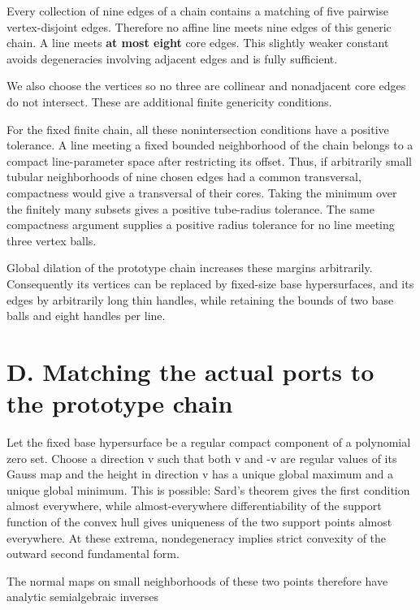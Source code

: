 \documentclass[11pt,a4paper]{article}
\begin{document}
Every collection of nine edges of a chain contains a matching of five
pairwise vertex-disjoint edges. Therefore no affine line meets nine
edges of this generic chain. A line meets \textbf{at most eight} core
edges. This slightly weaker constant avoids degeneracies involving
adjacent edges and is fully sufficient.

We also choose the vertices so no three are collinear and nonadjacent
core edges do not intersect. These are additional finite genericity
conditions.

For the fixed finite chain, all these nonintersection conditions have a
positive tolerance. A line meeting a fixed bounded neighborhood of the
chain belongs to a compact line-parameter space after restricting its
offset. Thus, if arbitrarily small tubular neighborhoods of nine chosen
edges had a common transversal, compactness would give a transversal of
their cores. Taking the minimum over the finitely many subsets gives a
positive tube-radius tolerance. The same compactness argument supplies a
positive radius tolerance for no line meeting three vertex balls.

Global dilation of the prototype chain increases these margins
arbitrarily. Consequently its vertices can be replaced by fixed-size
base hypersurfaces, and its edges by arbitrarily long thin handles,
while retaining the bounds of two base balls and eight handles per line.

\hypertarget{1022-d.-matching-the-actual-ports-to-the-prototype-chain}{%
\section{D. Matching the actual ports to the prototype
chain}\label{1022-d.-matching-the-actual-ports-to-the-prototype-chain}}

Let the fixed base hypersurface be a regular compact component of a
polynomial zero set. Choose a direction v such that both v and -v are
regular values of its Gauss map and the height in direction v has a
unique global maximum and a unique global minimum. This is possible:
Sard's theorem gives the first condition almost everywhere, while
almost-everywhere differentiability of the support function of the
convex hull gives uniqueness of the two support points almost
everywhere. At these extrema, nondegeneracy implies strict convexity of
the outward second fundamental form.

The normal maps on small neighborhoods of these two points therefore
have analytic semialgebraic inverses
\end{document}
